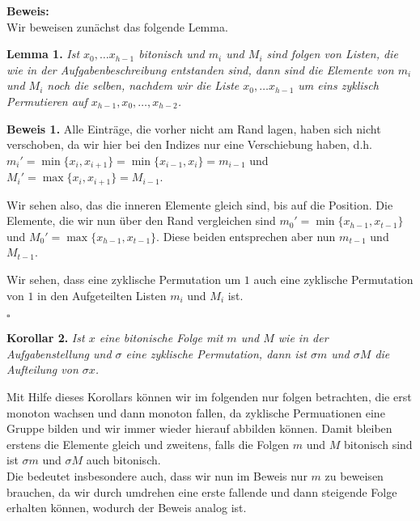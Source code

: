 \documentclass[11pt,a4paper,ngerman]{article}
\begin{document}
\noindent\textbf{Beweis:}\\

Wir beweisen zunächst das folgende Lemma.

\noindent\textbf{Lemma 1.} {\itshape Ist $x_0, \ldots x_{h-1}$ bitonisch und $m_i$ und $M_i$ sind folgen von Listen, die wie in
der Aufgabenbeschreibung entstanden sind, dann sind die Elemente von $m_i$ und $M_i$ noch die selben, nachdem wir die Liste $x_0, \ldots x_{h-1}$
um eins zyklisch Permutieren auf $x_{h-1}, x_0, \ldots, x_{h-2}$.
}

\noindent\textbf{Beweis 1.}
Alle Einträge, die vorher nicht am Rand lagen, haben sich nicht verschoben, da wir hier bei den Indizes nur eine Verschiebung haben,
d.h. $m_i' = \min \{x_i, x_{i+1}\} = \min \{x_{i-1}, x_i\} = m_{i-1}$ und $M_i' = \max \{ x_i, x_{i+1}\} = M_{i-1}$.

Wir sehen also, das die inneren Elemente gleich sind, bis auf die Position. Die Elemente, die wir nun über den Rand vergleichen sind
$m_0' = \min \{ x_{h-1}, x_{t-1} \}$ und $M_0' = \max \{ x_{h-1}, x_{t-1}\}$. Diese beiden entsprechen aber nun $m_{t-1}$ und $M_{t-1}$.

Wir sehen, dass eine zyklische Permutation um $1$ auch eine zyklische Permutation von $1$ in den Aufgeteilten Listen $m_i$ und $M_i$ ist.

\mbox{}\hfill$\square$

\noindent\textbf{Korollar 2.}{\itshape 
Ist $x$ eine bitonische Folge mit $m$ und $M$ wie in der Aufgabenstellung und $\sigma$ eine zyklische Permutation, dann
ist $\sigma m$ und $\sigma M$ die Aufteilung von $\sigma x$.
}

Mit Hilfe dieses Korollars können wir im folgenden nur folgen betrachten, die erst monoton wachsen und dann monoton fallen, da zyklische Permuationen eine Gruppe bilden und wir immer wieder hierauf abbilden können. Damit bleiben erstens die Elemente gleich und zweitens, falls die Folgen $m$ und $M$ bitonisch sind ist $\sigma m$ und $\sigma M$ auch bitonisch.\\

Die bedeutet insbesondere auch, dass wir nun im Beweis nur $m$ zu beweisen brauchen, da wir durch umdrehen eine erste fallende und dann steigende Folge erhalten können, wodurch der Beweis analog ist.
\end{document}
